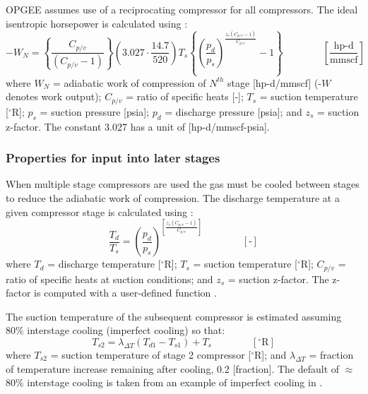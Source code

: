 \documentclass[11pt]{report}
\newcommand{\xlname}[1]{\raisebox{1pt}{\fcolorbox{light-gray}{light-gray}{\texttt{\textcolor{stanford}{\scriptsize{#1}}}}}}
\newcommand{\eqnunit}[1]{\quad\quad \scriptstyle{\left[\text{#1}\right]}}
\newcommand{\eqnunitfrac}[2]{\quad\quad \scriptstyle{\left[\frac{\text{#1}}{\text{#2}}\right]}}
\begin{document}
OPGEE assumes use of a reciprocating compressor for all compressors. The ideal isentropic horsepower is calculated using \cite[p. 105]{Jarrell2002}:  
\begin{equation} \label{eq:compressor_work}
-W_{N}=\left\{{\frac{C_{p/v}}{\left(C_{p/v}-1\right)}}\right\} \left(3.027 \cdot \frac{14.7}{520}\right) T_{s}\left\{\left(\frac{p_{d}}{p_{s}}\right)^\frac{z_{s}\left(C_{p/v}-1\right)}{C_{p/v}}-1\right\} \quad\quad\eqnunitfrac{hp-d}{mmscf}
\end{equation}
where $W_{N}$ = adiabatic work of compression of $N^{th}$ stage [hp-d/mmscf] (-$W$ denotes work output); $C_{p/v}$ = ratio of specific heats [-]; $T_{s}$ = suction temperature [$^{\circ}${R}]; $p_{s}$ = suction pressure [psia]; $p_{d}$ = discharge pressure [psia]; and $z_{s}$ = suction z-factor. The constant 3.027 has a unit of [hp-d/mmscf-psia].

\subsubsection{Properties for input into later stages}

When multiple stage compressors are used the gas must be cooled between stages to reduce the adiabatic work of compression. The discharge temperature at a given compressor stage is calculated using \cite[p. 105]{Jarrell2002}: 
\begin{equation} \label{eq:compressor_discharge_temp}
\frac{T_{d}}{T_{s}}=\left(\frac{p_{d}}{p_{s}}\right)^{\left[\frac{z_{s}\left(C_{p/v}-1\right)}{C_{p/v}}\right]} \quad\quad\eqnunit{-}
\end{equation}
where $T_{d}$ = discharge temperature [$^{\circ}$R]; $T_{s}$ = suction temperature [$^{\circ}${R}]; $C_{p/v}$ = ratio of specific heats at suction conditions; and $z_{s}$ = suction z-factor. The z-factor is computed with a user-defined function \xlname{zfactor}.

The suction temperature of the subsequent compressor is estimated assuming 80\% interstage cooling (imperfect cooling) so that:
\begin{equation} \label{eq:compressor2_suction_temp}
T_{s2}= \lambda_{\Delta T}\left(T_{d1}-T_{s1}\right) +T_{s} \quad\quad\eqnunit{$^{\circ}${R}}
\end{equation}
where $T_{s2}$ = suction temperature of stage 2 compressor [$^{\circ}${R}]; and $\lambda_{\Delta T}$ = fraction of temperature increase remaining after cooling, 0.2 [fraction]. The default of $\approx$80\% interstage cooling is taken from an example of imperfect cooling in \cite[Table 7]{UNEP2006}.
\end{document}
